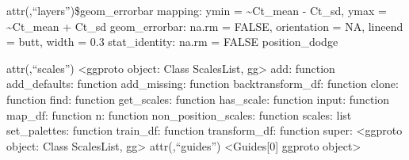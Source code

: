 \documentclass[
]{article}
\begin{document}
attr(,``layers'')\$geom\_errorbar mapping: ymin =
\textasciitilde Ct\_mean - Ct\_sd, ymax = \textasciitilde Ct\_mean +
Ct\_sd geom\_errorbar: na.rm = FALSE, orientation = NA, lineend = butt,
width = 0.3 stat\_identity: na.rm = FALSE position\_dodge

attr(,``scales'') \textless ggproto object: Class ScalesList,
gg\textgreater{} add: function add\_defaults: function add\_missing:
function backtransform\_df: function clone: function find: function
get\_scales: function has\_scale: function input: function map\_df:
function n: function non\_position\_scales: function scales: list
set\_palettes: function train\_df: function transform\_df: function
super: \textless ggproto object: Class ScalesList, gg\textgreater{}
attr(,``guides'') \textless Guides{[}0{]} ggproto object\textgreater{}
\end{document}
